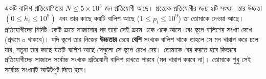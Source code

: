 \begin{problem}
\label{pillow_tower}
একটি বালিশ প্রতিযোগিতায় $N \le 5\times 10^3$ জন প্রতিযোগী আছে। প্রত্যেক প্রতিযোগীর জন্য ২টি সংখ্যা- তার উচ্চতা $(0 \le h_i \le 10^9)$ এবং তার কাছে কয়টি বালিশ আছে ($1 \le p_i \le 10^9$) তা তোমাকে দেওয়া আছে। প্রতিযোগীদের নির্দিষ্ট একটি ক্রমে সাজানোর পর তারা সেই ক্রমে একে একে আসে এবং স্তূপে বালিশের সংখ্যা দেখে (প্রথমে ০ থাকবে)। যদি স্তূপে তার নিজের \textbf{উচ্চতার} চেয়ে \textbf{বেশি} সংখ্যক বালিশ থাকে তাহলে সে মন খারাপ করে চলে যায়, নতুবা তার কাছে যতটি বালিশ আছে সেগুলো সে স্তূপে রেখে দেয়। তোমাকে বের করতে হবে কিভাবে প্রতিযোগীদের সাজালে সর্বোচ্চ সংখ্যক প্রতিযোগী বালিশ রাখতে পারবে (মন খারাপ করবে না)। তোমাকে শুধু সেই সর্বোচ্চ সংখ্যাটি আউটপুট দিতে হবে।
\end{problem}
